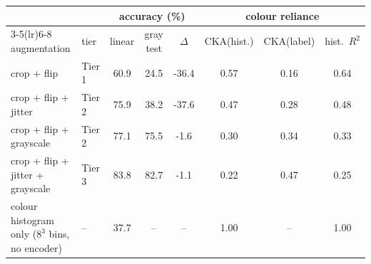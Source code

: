 \begin{tabular}{l l ccc ccc}
\toprule
 & & \multicolumn{3}{c}{accuracy (\%)} & \multicolumn{3}{c}{colour reliance} \\
\cmidrule(lr){3-5}\cmidrule(lr){6-8}
augmentation & tier & linear & gray test & $\Delta$ & CKA(hist.) & CKA(label) & hist.\ $R^2$ \\
\midrule
crop + flip & Tier 1 & 60.9 & 24.5 & -36.4 & 0.57 & 0.16 & 0.64 \\
crop + flip + jitter & Tier 2 & 75.9 & 38.2 & -37.6 & 0.47 & 0.28 & 0.48 \\
crop + flip + grayscale & Tier 2 & 77.1 & 75.5 & -1.6 & 0.30 & 0.34 & 0.33 \\
crop + flip + jitter + grayscale & Tier 3 & 83.8 & 82.7 & -1.1 & 0.22 & 0.47 & 0.25 \\
\midrule
colour histogram only ($8^3$ bins, no encoder) & -- & 37.7 & -- & -- & 1.00 & -- & 1.00 \\
\bottomrule
\end{tabular}
